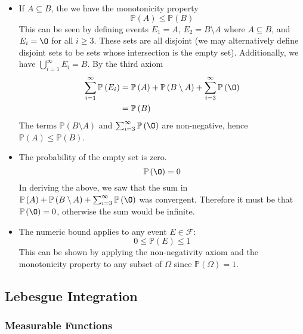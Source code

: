 \documentclass[11pt]{report} %
\begin{document}
\begin{itemize}
\item If $A \subseteq B$, the we have the monotonicity property
\begin{equation}
\mathbb{P}\left(A\right) \leq \mathbb{P}\left(B\right)
\end{equation}
This can be seen by defining events $E_{1} = A$, $E_{2} = B\setminus A$ where $A\subseteq B$, and $E_{i} = \O$ for all $i\geq 3$. These sets are all disjoint (we may alternatively define disjoint sets to be sets whose intersection is the empty set). Additionally, we have $\bigcup_{i = 1}^{\infty}E_{i} = B$. By the third axiom
\begin{align}
\sum_{i = 1}^{\infty}\mathbb{P}\left(E_{i}\right) &= \mathbb{P}\left(A\right) + \mathbb{P}\left(B\setminus A\right) + \sum_{i = 3}^{\infty}\mathbb{P}\left(\O\right) \\
&= \mathbb{P}\left(B\right)
\end{align}
The terms $\mathbb{P}\left(B\setminus A\right)$ and $\sum_{i = 3}^{\infty}\mathbb{P}\left(\O\right)$ are non-negative, hence $\mathbb{P}\left(A\right) \leq \mathbb{P}\left(B\right)$.
\item The probability of the empty set is zero.
\begin{equation}
\mathbb{P}\left(\O\right) = 0
\end{equation}
In deriving the above, we saw that the sum in $\mathbb{P}\left(A\right) + \mathbb{P}\left(B\setminus A\right) + \sum_{i = 3}^{\infty}\mathbb{P}\left(\O\right)$ was convergent. Therefore it must be that $\mathbb{P}\left(\O\right) = 0$, otherwise the sum would be infinite.
\item The numeric bound applies to any event $E \in \mathcal{F}$:
\begin{equation}
0 \leq \mathbb{P}\left(E\right) \leq 1
\end{equation}
This can be shown by applying the non-negativity axiom and the monotonicity property to any subset of $\Omega$ since $\mathbb{P}\left(\Omega\right) = 1$.
\end{itemize}

\subsection{Lebesgue Integration}

\subsubsection{Measurable Functions}
\end{document}
